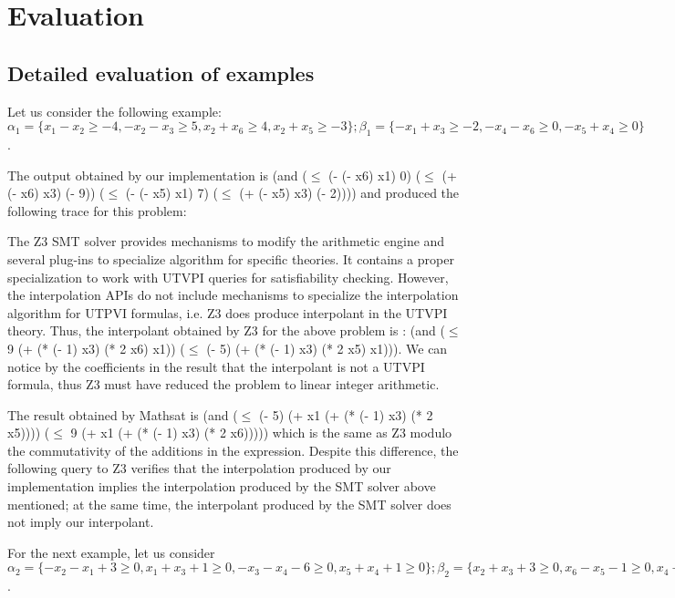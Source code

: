 \section{Evaluation}

\subsection{Detailed evaluation of examples}

Let us consider the following example:
$\alpha_1 = \{x_1 - x_2 \geq -4, -x_2 - x_3 \geq 5, 
  x_2 + x_6 \geq 4, x_2 + x_5 \geq -3\}; 
\beta_1 = \{-x_1 + x_3 \geq -2, -x_4 - x_6 \geq 0, -x_5 + x_4 \geq 0\}$. 

The output obtained by our implementation is
(and ($\leq$ (- (- x6) x1) 0)
($\leq$ (+ (- x6) x3) (- 9))
($\leq$ (- (- x5) x1) 7)
($\leq$ (+ (- x5) x3) (- 2))))
and produced the following trace
for this problem:



The Z3 SMT solver provides mechanisms to modify the arithmetic engine 
and several plug-ins to specialize algorithm for specific theories. It contains a
proper specialization to work with UTVPI queries for satisfiability checking. 
However,  the interpolation APIs do not include mechanisms to specialize the 
interpolation algorithm for UTPVI formulas, i.e. Z3 does produce interpolant
in the UTVPI theory.
Thus, the interpolant obtained by Z3 for the above problem is : 
(and ($\leq$ 9 (+ (* (- 1) x3) (* 2 x6) x1)) ($\leq$ (- 5) (+ (* (- 1) x3) (* 2 x5) x1))).
We can notice by the coefficients in the result that the interpolant is not
a UTVPI formula, thus Z3 must have reduced the problem to linear integer arithmetic.

The result obtained by Mathsat is 
(and ($\leq$ (- 5) (+ x1 (+ (* (- 1) x3) (* 2 x5)))) ($\leq$ 9 (+ x1 (+ (* (- 1) x3) (* 2 x6))))) 
which is the same as Z3 modulo the commutativity of the
additions in the expression. Despite this difference, the following query 
to Z3 verifies that the interpolation produced by our implementation implies 
the interpolation produced by the SMT solver above mentioned; at the same time,
the interpolant produced by the SMT solver does not imply our interpolant.



For the next example, let us consider $\alpha_2 = \{
  -x_2 - x_1 + 3 \geq 0, 
  x_1 + x_3 + 1 \geq 0, 
  -x_3 - x_4 - 6 \geq 0, 
  x_5 + x_4 + 1 \geq 0 
\}; \beta_2 = \{
  x_2 + x_3 + 3 \geq 0,
  x_6 - x_5 - 1 \geq 0,
  x_4 - x_6 + 4 \geq 0
\}$. 


